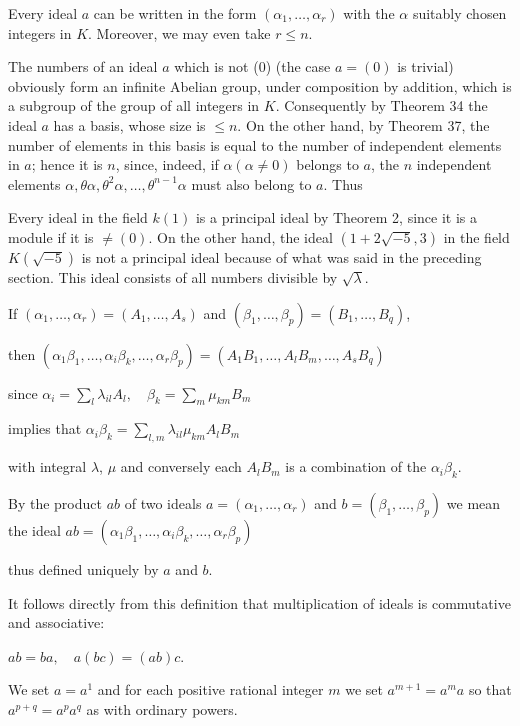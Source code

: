 Every ideal $a$ can be written in the form $(\alpha_1, \ldots, \alpha_r)$ with the $\alpha$ suitably chosen integers in $K$. Moreover, we may even take $r \leq n$.

The numbers of an ideal $a$ which is not (0) (the case $a = (0)$ is trivial) obviously form an infinite Abelian group, under composition by addition, which is a subgroup of the group of all integers in $K$. Consequently by Theorem 34 the ideal $a$ has a basis, whose size is $\leq n$. On the other hand, by Theorem 37, the number of elements in this basis is equal to the number of independent elements in $a$; hence it is $n$, since, indeed, if $\alpha (\alpha \neq 0)$ belongs to $a$, the $n$ independent elements $\alpha, \theta\alpha, \theta^2\alpha, \ldots, \theta^{n-1}\alpha$ must also belong to $a$. Thus

Every ideal in the field $k(1)$ is a principal ideal by Theorem 2, since it is a module if it is $\neq (0)$. On the other hand, the ideal $(1 + 2\sqrt{-5}, 3)$ in the field $K(\sqrt{-5})$ is not a principal ideal because of what was said in the preceding section. This ideal consists of all numbers divisible by $\sqrt{\lambda}$.

If
$(\alpha_1, \ldots, \alpha_r) = (A_1, \ldots, A_s)$ and $(\beta_1, \ldots, \beta_p) = (B_1, \ldots, B_q)$,

then
$(\alpha_1\beta_1, \ldots, \alpha_i\beta_k, \ldots, \alpha_r\beta_p) = (A_1B_1, \ldots, A_lB_m, \ldots, A_sB_q)$

since
$\alpha_i = \sum_l \lambda_{il}A_l, \quad \beta_k = \sum_m \mu_{km}B_m$

implies that
$\alpha_i\beta_k = \sum_{l,m} \lambda_{il}\mu_{km}A_lB_m$

with integral $\lambda$, $\mu$ and conversely each $A_lB_m$ is a combination of the $\alpha_i\beta_k$.

By the product $ab$ of two ideals $a = (\alpha_1, \ldots, \alpha_r)$ and $b = (\beta_1, \ldots, \beta_p)$ we mean the ideal
$ab = (\alpha_1\beta_1, \ldots, \alpha_i\beta_k, \ldots, \alpha_r\beta_p)$

thus defined uniquely by $a$ and $b$.

It follows directly from this definition that multiplication of ideals is commutative and associative:

$ab = ba, \quad a(bc) = (ab)c$.

We set $a = a^1$ and for each positive rational integer $m$ we set $a^{m+1} = a^m a$ so that $a^{p+q} = a^p a^q$ as with ordinary powers.

